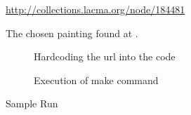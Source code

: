 \documentclass{article}
\begin{document}
\begin{flushleft}
\begin{figure}[h]
\centering
{}
\urldef\myurl\url{http://collections.lacma.org/node/184481}
\caption{The chosen painting found at \myurl.}
\end{figure}

\begin{figure}[h]
\centering
\begin{subfigure}{0.5\textwidth}
\centering
{}
\caption{Hardcoding the url into the code}
\end{subfigure}%
\begin{subfigure}{0.5\textwidth}
\centering
{}
\caption{Execution of make command}
\end{subfigure}
\caption{Sample Run}
\end{figure}


\end{flushleft}
\end{document}
